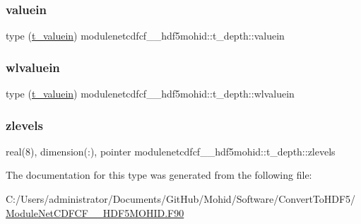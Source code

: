 \subsubsection{\texorpdfstring{valuein}{valuein}}
{\footnotesize\ttfamily type (\mbox{\hyperlink{structmodulenetcdfcf__2__hdf5mohid_1_1t__valuein}{t\+\_\+valuein}}) modulenetcdfcf\+\_\+\_\+hdf5mohid\+::t\+\_\+depth\+::valuein\hspace{0.3cm}{\ttfamily [private]}}

\mbox{\label{structmodulenetcdfcf__2__hdf5mohid_1_1t__depth_ad64cc4dbad47dfc845ff380a2e661686}} 
\subsubsection{\texorpdfstring{wlvaluein}{wlvaluein}}
{\footnotesize\ttfamily type (\mbox{\hyperlink{structmodulenetcdfcf__2__hdf5mohid_1_1t__valuein}{t\+\_\+valuein}}) modulenetcdfcf\+\_\+\_\+hdf5mohid\+::t\+\_\+depth\+::wlvaluein\hspace{0.3cm}{\ttfamily [private]}}

\mbox{\label{structmodulenetcdfcf__2__hdf5mohid_1_1t__depth_a211824d21f36b492c7cec9c8f899fe93}} 
\subsubsection{\texorpdfstring{zlevels}{zlevels}}
{\footnotesize\ttfamily real(8), dimension(\+:), pointer modulenetcdfcf\+\_\+\_\+hdf5mohid\+::t\+\_\+depth\+::zlevels\hspace{0.3cm}{\ttfamily [private]}}



The documentation for this type was generated from the following file\+:\begin{DoxyCompactItemize}
\item 
C\+:/\+Users/administrator/\+Documents/\+Git\+Hub/\+Mohid/\+Software/\+Convert\+To\+H\+D\+F5/\mbox{\hyperlink{_module_net_c_d_f_c_f__2___h_d_f5_m_o_h_i_d_8_f90}{Module\+Net\+C\+D\+F\+C\+F\+\_\+\_\+\+H\+D\+F5\+M\+O\+H\+I\+D.\+F90}}\end{DoxyCompactItemize}
